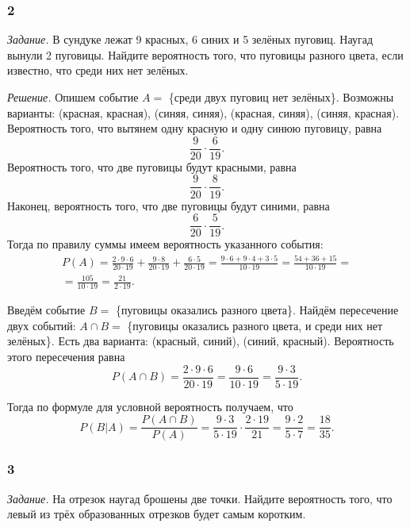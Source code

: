 \subsubsection*{2}

\textit{Задание.} В сундуке лежат 9 красных, 6 синих и 5 зелёных пуговиц.
Наугад вынули 2 пуговицы.
Найдите вероятность того, что пуговицы разного цвета, если известно, что среди них нет зелёных.

\textit{Решение.} Опишем событие $A =$ \{среди двух пуговиц нет зелёных\}.
Возможны варианты: (красная, красная), (синяя, синяя), (красная, синяя), (синяя, красная).
Вероятность того, что вытянем одну красную и одну синюю пуговицу, равна
$$ \frac{9}{20} \cdot \frac{6}{19}.$$
Вероятность того, что две пуговицы будут красными, равна
$$ \frac{9}{20} \cdot \frac{8}{19}.$$
Наконец, вероятность того, что две пуговицы будут синими, равна
$$ \frac{6}{20} \cdot \frac{5}{19}.$$
Тогда по правилу суммы имеем вероятность указанного события:
\begin{equation*}
\begin{split}
P \left( A \right) =
\frac{2 \cdot 9 \cdot 6}{20 \cdot 19} + \frac{9 \cdot 8}{20 \cdot 19} + \frac{6 \cdot 5}{20 \cdot 19} =
\frac{9 \cdot 6 + 9 \cdot 4 + 3 \cdot 5}{10 \cdot 19} =
\frac{54 + 36 + 15}{10 \cdot 19} = \\
= \frac{105}{10 \cdot 19} =
\frac{21}{2 \cdot 19}.
\end{split}
\end{equation*}

Введём событие $B =$ \{пуговицы оказались разного цвета\}.
Найдём пересечение двух событий: $A \cap B =$ \{пуговицы оказались разного цвета, и среди них нет зелёных\}.
Есть два варианта: (красный, синий), (синий, красный).
Вероятность этого пересечения равна
$$P \left( A \cap B \right) =
\frac{2 \cdot 9 \cdot 6}{20 \cdot 19} =
\frac{9 \cdot 6}{10 \cdot 19} =
\frac{9 \cdot 3}{5 \cdot 19}.$$

Тогда по формуле для условной вероятность получаем, что
$$P \left( \left. B \right| A \right) =
\frac{P \left( A \cap B \right) }{P \left( A \right) } =
\frac{9 \cdot 3}{5 \cdot 19} \cdot \frac{2 \cdot 19}{21} =
\frac{9 \cdot 2}{5 \cdot 7} =
\frac{18}{35}.$$

\subsubsection*{3}

\textit{Задание.} На отрезок наугад брошены две точки.
Найдите вероятность того, что левый из трёх образованных отрезков будет самым коротким.

